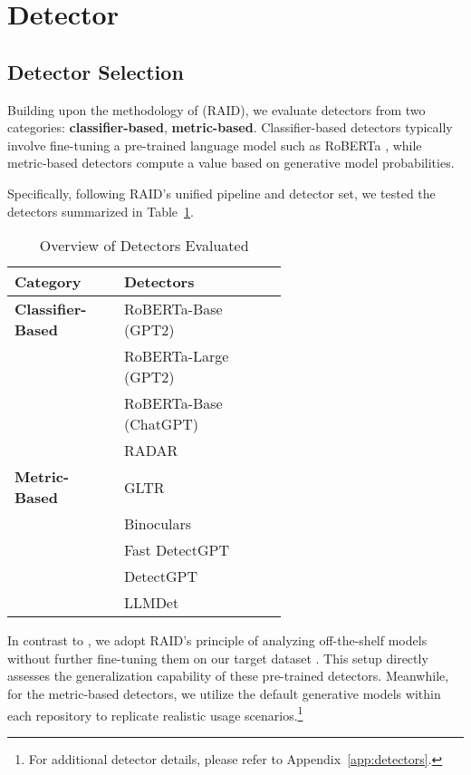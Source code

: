 \section{Detector}
\label{sec:detector}
\subsection{Detector Selection}
Building upon the methodology of \citet{dugan2024raidsharedbenchmarkrobust} (RAID), we evaluate detectors from two categories: \textbf{classifier-based}, \textbf{metric-based}. Classifier-based detectors typically involve fine-tuning a pre-trained language model such as RoBERTa \cite{liu2019roberta}, while metric-based detectors compute a value based on generative model probabilities. 

Specifically, following RAID’s unified pipeline and detector set, we tested the detectors summarized in Table~\ref{tab:detectors}.

\begin{table}[ht]
\centering
\small
\begin{tabular}{l p{0.6\linewidth}}
\toprule
\textbf{Category} & \textbf{Detectors} \\
\midrule
\textbf{Classifier-Based} &
  RoBERTa-Base (GPT2) \cite{solaiman-etal-2019}\\
  & RoBERTa-Large (GPT2) \cite{liu2019roberta}\\
  & RoBERTa-Base (ChatGPT) \cite{guo2023close}\\
  & RADAR \cite{hu2023radar}\\
\midrule
\textbf{Metric-Based} &
  GLTR \cite{gehrmann-etal-2019-gltr} \\
  & Binoculars \cite{hans2024spotting}\\
  & Fast DetectGPT \cite{bao2023fastdetectgpt}\\
  & DetectGPT \cite{mitchell-etal-2023-detectgpt} \\
  & LLMDet \cite{wu-etal-2023-llmdet}\\
\bottomrule
\end{tabular}
\caption{Overview of Detectors Evaluated}
\label{tab:detectors}
\end{table}

In contrast to \citet{Li2024mage}, we adopt RAID’s principle of analyzing off-the-shelf models without further fine-tuning them on our target dataset \citep{dugan2024raidsharedbenchmarkrobust}. This setup directly assesses the generalization capability of these pre-trained detectors. Meanwhile, for the metric-based detectors, we utilize the default generative models within each repository to replicate realistic usage scenarios.\footnote{For additional detector details, please refer to Appendix~\ref{app:detectors}.}

